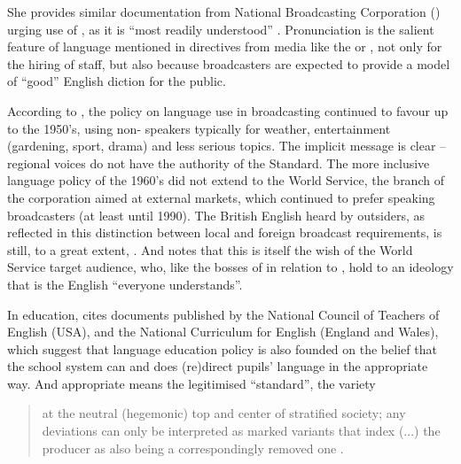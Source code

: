 She provides similar documentation from National Broadcasting Corporation () urging use of , as it is “most readily understood” \citep[138]{Lippi-Green1997}.  Pronunciation is the salient feature of language mentioned in directives from media like the  or , not only for the hiring of staff, but also because broadcasters are expected to provide a model of “good” English diction for the public. 

According to \citet{McArthur1992}, the  policy on language use in broadcasting continued to favour  up to the 1950's, using non- speakers typically for weather, entertainment (gardening, sport, drama) and less serious topics.  The implicit message is clear – regional voices do not have the authority of the  Standard.  The more inclusive language policy of the 1960's did not extend to the World Service, the branch of the corporation aimed at external markets, which continued to prefer  speaking broadcasters (at least until 1990).  The British English heard by outsiders, as reflected in this distinction between local and foreign broadcast requirements, is still, to a great extent, .  And \citet[59]{Sharwood-Smith1999} notes that this is itself the wish of the World Service target audience, who, like the bosses of  in relation to , hold to an ideology that  is the English “everyone understands”. 

In education, \citet[109]{Lippi-Green1997} cites documents published by the National Council of Teachers of English (USA), and \citet[147]{Cheshire1999} the National Curriculum for English (England and Wales), which suggest that language education policy is also founded on the belief that the school system can and does (re)direct pupils’ language in the appropriate way.  And appropriate means the legitimised “standard”, the variety

\begin{quote}
at the neutral (hegemonic) top and center of stratified society; any deviations can only be interpreted as marked variants that index (...) the producer as also being a correspondingly removed one \citep[412]{Silverstein1998}.
\end{quote}

